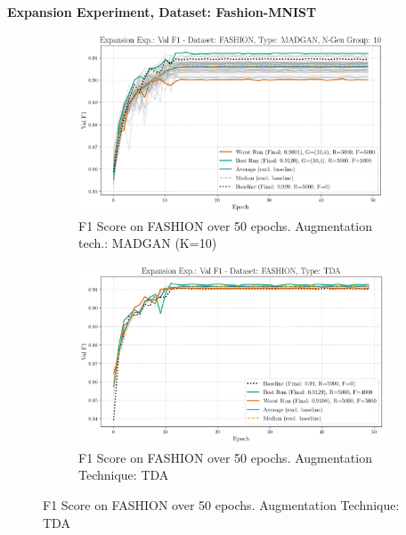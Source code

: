 \newpage
\noindent\textbf{Expansion Experiment, Dataset: Fashion-MNIST}
\begin{figure}[H]
	\centering
	\begin{subfigure}{.85\textwidth}
		\includegraphics[width=\textwidth]{abb/strat_classifier_performance/FASHION_STRATIFIED_CLASSIFIERS_MADGAN_NEW/expansion_experiments/val_f1_score_MADGAN_FASHION_n_gen_10_all.png}
		\caption{F1 Score on FASHION over 50 epochs. Augmentation tech.: MADGAN (K=10)}
        \label{fig:res_expansion_fashion_tda_vs_madgan__madgan}
	\end{subfigure}
	\begin{subfigure}{.85\textwidth}
		\includegraphics[width=\textwidth]{abb/strat_classifier_performance/tda_fashion_mnist/expansion_experiments/val_f1_score_tda_fashion_mnist_fashion_all.png}
		\caption{F1 Score on FASHION over 50 epochs. Augmentation Technique: TDA}
        \label{fig:res_expansion_fashion_tda_vs_madgan__tda}
	\end{subfigure}
\end{figure}

